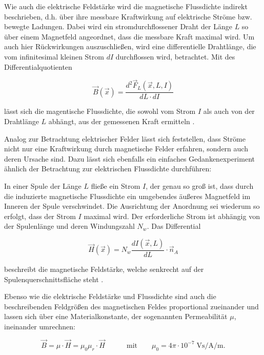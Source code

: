 Wie auch die elektrische Feldstärke wird die magnetische Flussdichte indirekt beschrieben, d.h. über ihre messbare Kraftwirkung auf elektrische Ströme bzw. bewegte Ladungen. Dabei wird ein stromdurchflossener Draht der Länge $L$ so über einem Magnetfeld angeordnet, dass die messbare Kraft maximal wird. Um auch hier Rückwirkungen auszuschließen, wird eine differentielle Drahtlänge, die vom infinitesimal kleinen Strom $dI$ durchflossen wird, betrachtet. Mit des Differentialquotienten

\begin{equation}
    \vec B(\vec x) = \frac{d^2 \vec F_L(\vec x,L,I)}{dL \cdot dI}
\end{equation}

lässt sich die magentische Flussdichte, die sowohl vom Strom $I$ als auch von der Drahtlänge $L$ abhängt, aus der gemessenen Kraft ermitteln \cite{EM_Schirmung}. 
\par
\vspace{\linespace}
Analog zur Betrachtung elektrischer Felder lässt sich feststellen, dass Ströme nicht nur eine Kraftwirkung durch magnetische Felder erfahren, sondern auch deren Ursache sind. Dazu lässt sich ebenfalls ein einfaches Gedankenexperiment ähnlich der Betrachtung zur elektrischen Flussdichte durchführen: 
\par
\vspace{\linespace}
In einer Spule der Länge $L$ fließe ein Strom $I$, der genau so groß ist, dass durch die induzierte magnetische Flussdichte ein umgebendes äußeres Magnetfeld im Inneren der Spule verschwindet. Die Ausrichtung der Anordnung sei wiederum so erfolgt, dass der Strom $I$ maximal wird. Der erforderliche Strom ist abhängig von der Spulenlänge und deren Windungszahl $N_w$. Das Differential

\begin{equation}
    \vec H(\vec x) = N_w \frac{dI(\vec x,L)}{dL} \cdot \vec n_A
\end{equation}

beschreibt die magnetische Feldstärke, welche senkrecht auf der Spulenquerschnittsfläche steht \cite{EM_Schirmung}. 
\par
\vspace{\linespace}
Ebenso wie die elektrische Feldstärke und Flussdichte sind auch die beschreibenden Feldgrößen des magnetischen Feldes proportional zueinander und lassen sich über eine Materialkonstante, der sogenannten Permeabilität $\mu$, ineinander umrechnen:

\begin{equation}
    \vec B = \mu \cdot \vec H = \mu_0 \mu_r \cdot \vec H \qquad \quad \text{mit} \qquad \mu_0 = 4 \pi \cdot 10^{-7} \; \si{\volt\second\per\ampere\per\meter}.
    \label{eq:2_Materialgleichung_magnetisches_Feld}
\end{equation}

